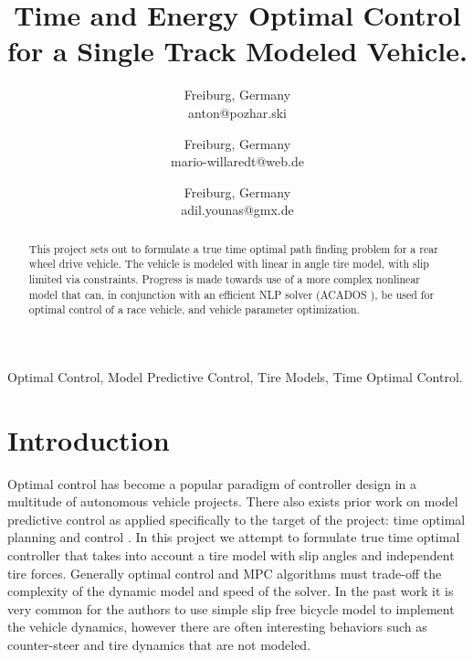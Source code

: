 \documentclass[conference,11pt]{IEEEtran}
\begin{document}
\title{Time and Energy Optimal Control for a Single Track Modeled Vehicle.}

\author{
Freiburg, Germany \\
anton@pozhar.ski
\and
{}
Freiburg, Germany \\
mario-willaredt@web.de
\and
{}
Freiburg, Germany \\
adil.younas@gmx.de
}

\maketitle

\begin{abstract}
  This project sets out to formulate a true time optimal path finding problem for a rear wheel drive vehicle. The vehicle is modeled with linear in angle tire model, with slip limited via constraints.
  Progress is made towards use of a more complex nonlinear model that can, in conjunction with an efficient NLP solver (ACADOS \cite{Verschueren2021}), be used for optimal control of a race vehicle,
  and vehicle parameter optimization.
\end{abstract}

\begin{IEEEkeywords}
Optimal Control, Model Predictive Control, Tire Models, Time Optimal Control.
\end{IEEEkeywords}

\section{Introduction}
Optimal control has become a popular paradigm of controller design in a multitude of autonomous vehicle projects. There also exists prior work on model predictive control as applied specifically
to the target of the project: time optimal planning and control \cite{Verschueren2014a}\cite{LOT20147559}. In this project we attempt to formulate true time optimal controller that takes into
account a tire model with slip angles and independent tire forces. Generally optimal control and MPC algorithms must trade-off the complexity of the dynamic model and speed of the solver. In the
past work it is very common for the authors to use simple slip free bicycle model to implement the vehicle dynamics, however there are often interesting behaviors such as counter-steer and tire
dynamics that are not modeled.
\end{document}
